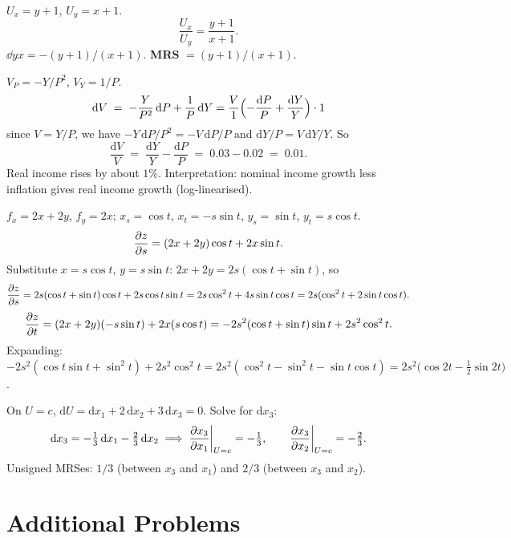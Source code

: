 \begin{solutions}
  \item $U_{x}=y+1$, $U_{y}=x+1$.
        \[
          \frac{U_{x}}{U_{y}}=\frac{y+1}{x+1} .
        \]
        $\dd{y}{x}=-(y+1)/(x+1)$. \textbf{MRS} $=(y+1)/(x+1)$.

  \item $V_{P}=-Y/P^{2}$, $V_{Y}=1/P$.
        \[
          \mathrm{d}V \;=\; -\frac{Y}{P^{2}}\,\mathrm{d}P+\frac{1}{P}\,\mathrm{d}Y
            =\frac{V}{1}\Bigl(-\frac{\mathrm{d}P}{P}+\frac{\mathrm{d}Y}{Y}\Bigr)\cdot 1
        \]
        since $V=Y/P$, we have $-Y\,\mathrm{d}P/P^{2}=-V\,\mathrm{d}P/P$
        and $\mathrm{d}Y/P=V\,\mathrm{d}Y/Y$. So
        \[
          \frac{\mathrm{d}V}{V} \;=\; \frac{\mathrm{d}Y}{Y}-\frac{\mathrm{d}P}{P}
            \;=\; 0.03-0.02 \;=\; 0.01 .
        \]
        Real income rises by about $1\%$. Interpretation: nominal income
        growth less inflation gives real income growth (log-linearised).

  \item $f_{x}=2x+2y$, $f_{y}=2x$; $x_{s}=\cos t$, $x_{t}=-s\sin t$,
        $y_{s}=\sin t$, $y_{t}=s\cos t$.
        \[
          \frac{\partial z}{\partial s}=(2x+2y)\cos t+2x\sin t .
        \]
        Substitute $x=s\cos t$, $y=s\sin t$: $2x+2y=2s(\cos t+\sin t)$,
        so
        \[
          \frac{\partial z}{\partial s}=2s(\cos t+\sin t)\cos t+2s\cos t\sin t
            =2s\cos^{2}t+4s\sin t\cos t
            =2s(\cos^{2}t+2\sin t\cos t) .
        \]
        \[
          \frac{\partial z}{\partial t}=(2x+2y)(-s\sin t)+2x(s\cos t)
            =-2s^{2}(\cos t+\sin t)\sin t+2s^{2}\cos^{2}t .
        \]
        Expanding: $-2s^{2}(\cos t\sin t+\sin^{2}t)+2s^{2}\cos^{2}t
          =2s^{2}(\cos^{2}t-\sin^{2}t-\sin t\cos t)
          =2s^{2}\bigl(\cos 2t-\tfrac12\sin 2t\bigr)$.

  \item On $U=c$, $\mathrm{d}U=\mathrm{d}x_{1}+2\,\mathrm{d}x_{2}
        +3\,\mathrm{d}x_{3}=0$. Solve for $\mathrm{d}x_{3}$:
        \[
          \mathrm{d}x_{3}=-\tfrac13\,\mathrm{d}x_{1}-\tfrac23\,\mathrm{d}x_{2}
          \;\Longrightarrow\;
          \frac{\partial x_{3}}{\partial x_{1}}\bigg|_{U=c}=-\tfrac13,\qquad
          \frac{\partial x_{3}}{\partial x_{2}}\bigg|_{U=c}=-\tfrac23 .
        \]
        Unsigned MRSes: $1/3$ (between $x_{3}$ and $x_{1}$) and $2/3$
        (between $x_{3}$ and $x_{2}$).
\end{solutions}

\section{Additional Problems}

